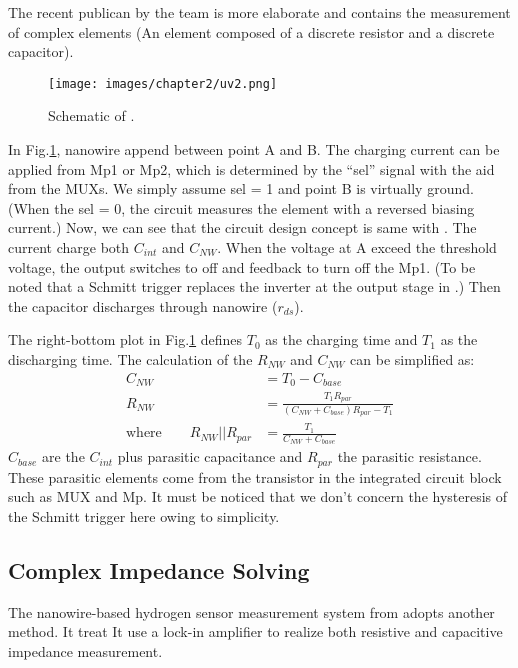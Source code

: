 The recent publican \cite{Juv2} by the team is more elaborate and contains the measurement of complex elements (An element composed of a discrete resistor and a discrete capacitor).
\begin{figure}[!htbp]
    \centering
    \texttt{[image: images/chapter2/uv2.png]}
    \caption{Schematic of \cite{Juv2}.}
    \label{fig:tot2}
\end{figure}

In Fig.\ref{fig:tot2}, nanowire append between point A and B.
The charging current can be applied from Mp1 or Mp2, which is determined by the ``sel'' signal with the aid from the MUXs.
We simply assume sel = 1 and point B is virtually ground.
(When the sel = 0, the circuit measures the element with a reversed biasing current.)
Now, we can see that the circuit design concept is same with \cite{Juv1}.
The current charge both $C_{int}$ and $C_{NW}$.
When the voltage at A exceed the threshold voltage, the output switches to off and feedback to turn off the Mp1.
(To be noted that a Schmitt trigger replaces the inverter at the output stage in \cite{Juv1}.)
Then the capacitor discharges through nanowire ($r_{ds}$).

The right-bottom plot in Fig.\ref{fig:tot2} defines $T_0$ as the charging time and $T_1$ as the discharging time.
The calculation of the $R_{NW}$ and $C_{NW}$  can be simplified as:
\setlength{\mathindent}{2cm}
\begin{align}
                         C_{NW}            & = T_0 - C_{base}\\
                         R_{NW}            & = \frac{T_1R_{par}}{(C_{NW} + C_{base})R_{par} - T_1}\\
    \text{where} \qquad  R_{NW} || R_{par} & = \frac{T_1}{C_{NW} + C_{base}}
\end{align}
$C_{base}$ are the $C_{int}$ plus parasitic capacitance and $R_{par}$ the parasitic resistance.
These parasitic elements come from the transistor in the integrated circuit block such as MUX and Mp.
It must be noticed that we don't concern the hysteresis of the Schmitt trigger here owing to simplicity.


\subsection{Complex Impedance Solving}
The nanowire-based hydrogen sensor measurement system from \cite{Jlockin} adopts another method.
It treat
It use a lock-in amplifier to realize both resistive and capacitive impedance measurement.

